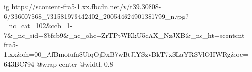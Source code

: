  
 
 
 
 

\ifcmt
  ig https://scontent-fra5-1.xx.fbcdn.net/v/t39.30808-6/336007568_731581978442402_200544624901381799_n.jpg?_nc_cat=102&ccb=1-7&_nc_sid=8bfeb9&_nc_ohc=ZrTPtWKkU5cAX_NzJXB&_nc_ht=scontent-fra5-1.xx&oh=00_AfBmoiufn8UiqOjDxB7wBtJlYSzvBkT7xSLaYRSVlOHWRg&oe=643BC794
  @wrap center
  @width 0.8
\fi
